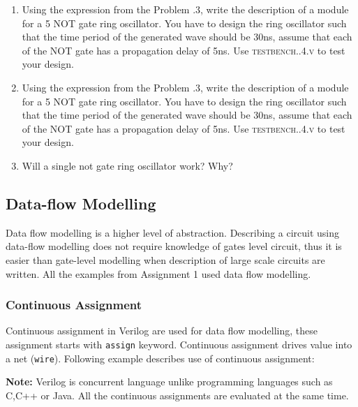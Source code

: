 \documentclass[a4paper,10pt]{article}
\newcommand{\ano}{\text{2}}
\theoremstyle{mytheor}
\newcommand{
  \insertverilog}[3]{
  
}
\newcounter{problemNumber}
\begin{document}
{\begin {enumerate}
  \item Using the expression from the Problem {\theproblemNumber}.3,
    write the description of a module for a 5 NOT gate ring
    oscillator. You have to design the ring oscillator such that the
    time period of the generated wave should be 30ns, assume that each
    of the NOT gate has a propagation delay of 5ns. Use
    \textsc{testbench{\ano}.{\theproblemNumber}.4.v} to test your
    design.

  \item Using the expression from the Problem {\theproblemNumber}.3,
    write the description of a module for a 5 NOT gate ring
    oscillator. You have to design the ring oscillator such that the
    time period of the generated wave should be 30ns, assume that each
    of the NOT gate has a propagation delay of 5ns. Use
    \textsc{testbench{\ano}.{\theproblemNumber}.4.v} to test your
    design.
  \item Will a single not gate ring oscillator work? Why?
  \end{enumerate}
} 


\subsection{Data-flow Modelling}
Data flow modelling is a higher level of abstraction. Describing a
circuit using data-flow modelling does not require knowledge of gates
level circuit, thus it is easier than gate-level modelling when
description of large scale circuits are written.  All the examples
from Assignment 1 used data flow modelling.

\subsubsection{Continuous Assignment}
\label{continuous-assignment}
Continuous assignment in Verilog are used for data flow modelling,
these assignment starts with
\lstinline[style=verilog-inline-style]{assign} keyword. Continuous
assignment drives value into a net
(\lstinline[style=verilog-inline-style]{wire}). Following example
describes use of continuous assignment:

{\color{red}\textbf{Note:}} Verilog is concurrent language unlike
programming languages such as C,C++ or Java. All the continuous
assignments are evaluated at the same time.

\insertverilog{./verilog_files/continuousAssignment.v}{continuous-assignment}{Example usage of continuous assignment.}
\end{document}
